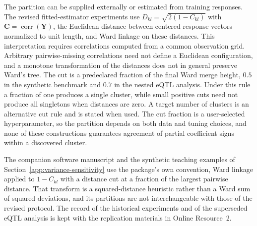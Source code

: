 \documentclass[11pt,a4paper]{article}
\begin{document}
The partition can be supplied externally or estimated from training responses.
The revised fitted-estimator experiments use $D_{kl}=\sqrt{2(1-C_{kl})}$ with
$\bm C=\operatorname{corr}(\bm Y)$, the Euclidean distance between centered
response vectors normalized to unit length, and Ward linkage on these
distances. This interpretation requires correlations computed from a common
observation grid. Arbitrary pairwise-missing correlations need not define a
Euclidean configuration, and a monotone transformation of the distances does
not in general preserve Ward's tree. The cut is a predeclared fraction of the
final Ward merge height, $0.5$ in the synthetic benchmark and $0.7$ in the
nested eQTL analysis. Under this rule a fraction of one produces a single
cluster, while small positive cuts need not produce all singletons when
distances are zero. A target number of clusters is an alternative cut rule and
is stated when used. The cut fraction is a user-selected hyperparameter, so
the partition depends on both data and tuning choices, and none of these
constructions guarantees agreement of partial coefficient signs within a
discovered cluster.

The companion software manuscript and the synthetic teaching examples of
Section~\ref{app:variance-sensitivity} use the package's own convention, Ward
linkage applied to $1-C_{kl}$ with a distance cut at a fraction of the largest
pairwise distance. That transform is a squared-distance heuristic rather than
a Ward sum of squared deviations, and its partitions are not interchangeable
with those of the revised protocol. The record of the historical experiments
and of the superseded eQTL analysis is kept with the replication materials in
Online Resource~2.



\end{document}
